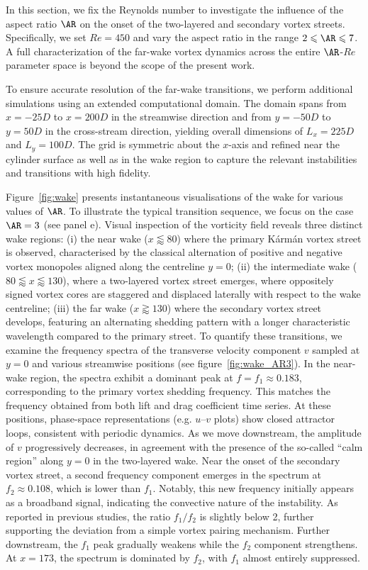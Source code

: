 In this section, we fix the Reynolds number to investigate the influence of the aspect ratio $\AR$ on the onset of the two-layered and secondary vortex streets. Specifically, we set $Re = 450$ and vary the aspect ratio in the range $2 \le \AR \le 7$. A full characterization of the far-wake vortex dynamics across the entire $\AR$-$Re$ parameter space is beyond the scope of the present work.

To ensure accurate resolution of the far-wake transitions, we perform additional simulations using an extended computational domain. The domain spans from $x = -25D$ to $x = 200D$ in the streamwise direction and from $y = -50D$ to $y = 50D$ in the cross-stream direction, yielding overall dimensions of $L_x = 225D$ and $L_y = 100D$. The grid is symmetric about the $x$-axis and refined near the cylinder surface as well as in the wake region to capture the relevant instabilities and transitions with high fidelity.

Figure~\ref{fig:wake} presents instantaneous visualisations of the wake for various values of $\AR$. To illustrate the typical transition sequence, we focus on the case $\AR = 3$ (see panel e). Visual inspection of the vorticity field reveals three distinct wake regions:
(i) the near wake ($x \lessapprox 80$) where the primary K\'{a}rm\'{a}n vortex street is observed, characterised by the classical alternation of positive and negative vortex monopoles aligned along the centreline $y = 0$;
(ii) the intermediate wake ($80 \lessapprox x \lessapprox 130$), where a two-layered vortex street emerges, where oppositely signed vortex cores are staggered and displaced laterally with respect to the wake centreline;
(iii) the far wake ($x \gtrapprox 130$) where the secondary vortex street develops, featuring an alternating shedding pattern with a longer characteristic wavelength compared to the primary street.
%
To quantify these transitions, we examine the frequency spectra of the transverse velocity component $v$ sampled at $y = 0$ and various streamwise positions (see figure~\ref{fig:wake_AR3}). In the near-wake region, the spectra exhibit a dominant peak at $f = f_1 \approx 0.183$, corresponding to the primary vortex shedding frequency. This matches the frequency obtained from both lift and drag coefficient time series. At these positions, phase-space representations (e.g. $u$–$v$ plots) show closed attractor loops, consistent with periodic dynamics.
%
As we move downstream, the amplitude of $v$ progressively decreases, in agreement with the presence of the so-called ``calm region'' along $y = 0$ in the two-layered wake. Near the onset of the secondary vortex street, a second frequency component emerges in the spectrum at $f_2 \approx 0.108$, which is lower than $f_1$. Notably, this new frequency initially appears as a broadband signal, indicating the convective nature of the instability. As reported in previous studies, the ratio $f_1/f_2$ is slightly below 2, further supporting the deviation from a simple vortex pairing mechanism. Further downstream, the $f_1$ peak gradually weakens while the $f_2$ component strengthens. At $x = 173$, the spectrum is dominated by $f_2$, with $f_1$ almost entirely suppressed.

